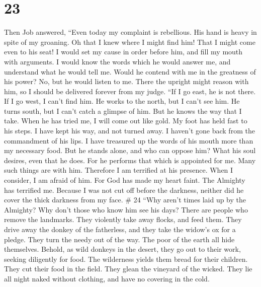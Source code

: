 \hypertarget{section-17}{%
\section{23}\label{section-17}}

 Then Job answered,  ``Even today my complaint
is rebellious. His hand is heavy in spite of my groaning. 
Oh that I knew where I might find him! That I might come even to his
seat!  I would set my cause in order before him, and fill my
mouth with arguments.  I would know the words which he would
answer me, and understand what he would tell me.  Would he
contend with me in the greatness of his power? No, but he would listen
to me.  There the upright might reason with him, so I should
be delivered forever from my judge.  ``If I go east, he is
not there. If I go west, I can't find him.  He works to the
north, but I can't see him. He turns south, but I can't catch a glimpse
of him.  But he knows the way that I take. When he has
tried me, I will come out like gold.  My foot has held fast
to his steps. I have kept his way, and not turned away.  I
haven't gone back from the commandment of his lips. I have treasured up
the words of his mouth more than my necessary food.  But he
stands alone, and who can oppose him? What his soul desires, even that
he does.  For he performs that which is appointed for me.
Many such things are with him.  Therefore I am terrified at
his presence. When I consider, I am afraid of him.  For God
has made my heart faint. The Almighty has terrified me. 
Because I was not cut off before the darkness, neither did he cover the
thick darkness from my face. \# 24  ``Why aren't times laid
up by the Almighty? Why don't those who know him see his days?
 There are people who remove the landmarks. They violently
take away flocks, and feed them.  They drive away the donkey
of the fatherless, and they take the widow's ox for a pledge.
 They turn the needy out of the way. The poor of the earth
all hide themselves.  Behold, as wild donkeys in the desert,
they go out to their work, seeking diligently for food. The wilderness
yields them bread for their children.  They cut their food
in the field. They glean the vineyard of the wicked.  They
lie all night naked without clothing, and have no covering in the cold.
